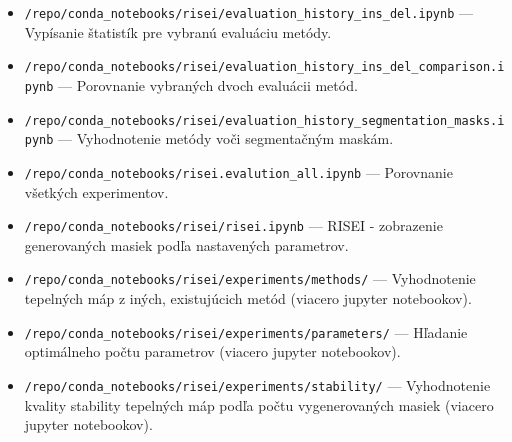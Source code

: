 \begin{itemize}
    \item \texttt{/repo/conda\_notebooks/risei/evaluation\_history\_ins\_del\-.ipynb} --- Vypísanie štatistík pre vybranú evaluáciu metódy.
    \item \texttt{/repo/conda\_notebooks/risei/evaluation\_history\_ins\_del\-\_comparison\-.ipynb} --- Porovnanie vybraných dvoch evaluácii metód.
    \item \texttt{/repo/conda\_notebooks/risei/evaluation\_history\_\-segmentation\-\_masks\-.ipynb} --- Vyhodnotenie metódy voči segmentačným maskám.
    \item \texttt{/repo/conda\_notebooks/risei.evalution\_all.ipynb} --- Porovnanie všetkých experimentov.
    \item \texttt{/repo/conda\_notebooks/risei/risei.ipynb} --- RISEI - zobrazenie generovaných masiek podľa nastavených parametrov.
    \item \texttt{/repo/conda\_notebooks/risei/experiments/methods/} --- Vyhodnotenie tepelných máp z iných, existujúcich metód (viacero jupyter notebookov).
    \item \texttt{/repo/conda\_notebooks/risei/experiments/parameters/} --- Hľadanie optimálneho počtu parametrov (viacero jupyter notebookov).
    \item \texttt{/repo/conda\_notebooks/risei/experiments/stability/} --- Vyhodnotenie kvality stability tepelných máp podľa počtu vygenerovaných masiek (viacero jupyter notebookov).
\end{itemize}
